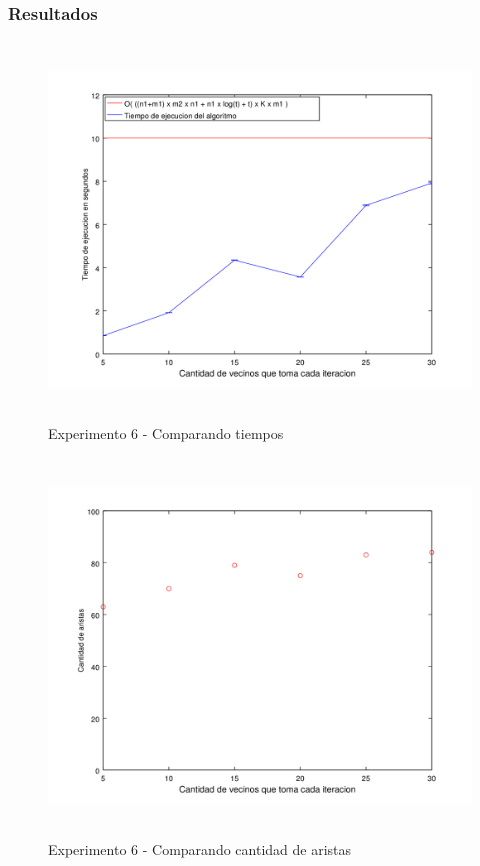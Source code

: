 \subsubsection*{Resultados}\;
    \begin{figure}[H]
      \includegraphics[height=10cm]{graficos/ejercicio6-exp6-tiempos.png}
       \caption{Experimento 6 - Comparando tiempos}
	\end{figure}

 \begin{figure}[H]
      \includegraphics[height=10cm]{graficos/ejercicio6-exp6-aristas.png}
       \caption{Experimento 6 - Comparando cantidad de aristas}
	\end{figure}


